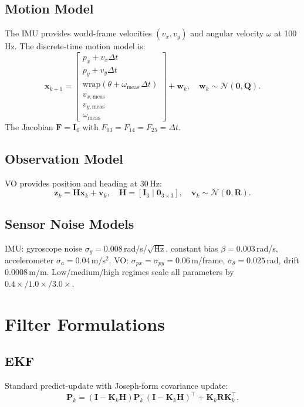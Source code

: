 \documentclass[letterpaper, 10pt, journal]{IEEEtran}
\newcommand{\bmx}{\bm{x}}
\newcommand{\bmP}{\bm{P}}
\newcommand{\bmF}{\bm{F}}
\newcommand{\bmH}{\bm{H}}
\newcommand{\bmK}{\bm{K}}
\newcommand{\bmQ}{\bm{Q}}
\newcommand{\bmR}{\bm{R}}
\newcommand{\bmI}{\bm{I}}
\newcommand{\bmz}{\bm{z}}
\newcommand{\Pm}{\bmP^{-}}
\begin{document}
\subsection{Motion Model}
The IMU provides world-frame velocities $(v_x, v_y)$ and angular velocity
$\omega$ at 100\,Hz. The discrete-time motion model is:
\begin{equation}
  \bmx_{k+1} = \begin{bmatrix}
    p_x + v_x \Delta t \\ p_y + v_y \Delta t \\
    \mathrm{wrap}(\theta + \omega_{\mathrm{meas}}\,\Delta t) \\
    v_{x,\mathrm{meas}} \\ v_{y,\mathrm{meas}} \\ \omega_{\mathrm{meas}}
  \end{bmatrix} + \bm{w}_k, \quad \bm{w}_k \sim \mathcal{N}(\bm{0},\bmQ).
  \label{eq:motion}
\end{equation}
The Jacobian $\bmF = \bmI_6$ with $F_{03}=F_{14}=F_{25}=\Delta t$.

\subsection{Observation Model}
VO provides position and heading at 30\,Hz:
\begin{equation}
  \bmz_k = \bmH\bmx_k + \bm{v}_k,\quad
  \bmH = [\bmI_3 \mid \bm{0}_{3\times 3}],\quad
  \bm{v}_k \sim \mathcal{N}(\bm{0},\bmR).
  \label{eq:obs}
\end{equation}

\subsection{Sensor Noise Models}
IMU: gyroscope noise $\sigma_g{=}0.008$\,rad/s/$\sqrt{\text{Hz}}$,
constant bias $\beta{=}0.003$\,rad/s, accelerometer $\sigma_a{=}0.04$\,m/s$^2$.
VO: $\sigma_{px}{=}\sigma_{py}{=}0.06$\,m/frame,
$\sigma_\theta{=}0.025$\,rad, drift $0.0008$\,m/m.
Low/medium/high regimes scale all parameters by $0.4\times/1.0\times/3.0\times$.

\section{Filter Formulations}
\label{sec:filters}

\subsection{EKF}
Standard predict-update with Joseph-form covariance update:
\begin{equation}
  \bmP_k = (\bmI{-}\bmK_k\bmH)\Pm_k(\bmI{-}\bmK_k\bmH)^\top + \bmK_k\bmR\bmK_k^\top.
  \label{eq:joseph}
\end{equation}
\end{document}
